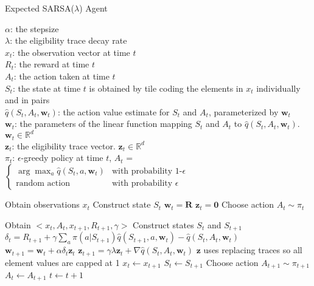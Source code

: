 \documentclass{article}
\begin{document}
\begin{algorithm}
\caption{Expected SARSA($\lambda$) Agent}\label{expectedsarsa}

$\alpha$: the stepsize \\
$\lambda$: the eligibility trace decay rate \\
$x_{t}$: the observation vector at time $t$ \\
$R_t$: the reward at time $t$ \\
$A_t$: the action taken at time $t$ \\
$S_t$: the state at time $t$ is obtained by tile coding the elements in $x_t$ individually and in pairs \\
$\hat{q}(S_t, A_t, \textbf{w}_t)$: the action value estimate for $S_t$ and $A_t$, parameterized by $\textbf{w}_t$\\
$\textbf{w}_t$: the parameters of the linear function mapping $S_t$ and $A_t$ to $\hat{q}(S_t, A_t, \textbf{w}_t)$. $\textbf{w}_t \in \mathbb{R}^d$ \\
$\textbf{z}_t$: the eligibility trace vector. $\textbf{z}_t \in \mathbb{R}^d$ \\
$\pi_t$: $\epsilon$-greedy policy at time $t$, $A_t$ = 
                        $\begin{cases} 
                            \arg\!\max_{a} \hat{q}(S_t, a, \textbf{w}_t) & \text{with probability 1-$\epsilon$} \\
                            \text{random action} & \text{with probability $\epsilon$}
                        \end{cases}$

\begin{algorithmic}[1]

\State Obtain observations $x_t$
\State Construct state $S_t$
\State $\textbf{w}_t = \textbf{R}$
\State $\textbf{z}_t = \textbf{0}$  
\State Choose action $A_t \sim \pi_t$ 

    \State Obtain $<x_t, A_t, x_{t+1}, R_{t+1}, \gamma>$
    \State Construct states $S_t$ and $S_{t+1}$
    \State $\delta_t = R_{t+1} + \gamma \displaystyle\sum_{a} \pi(a|S_{t+1}) \hat{q}(S_{t+1}, a, \textbf{w}_t)  - \hat{q}(S_t, A_t, \textbf{w}_t)$
    \State $\textbf{w}_{t+1} = \textbf{w}_{t} + \alpha \delta_t \textbf{z}_t$ 
    \State $\textbf{z}_{t+1} = \gamma \lambda \textbf{z}_t + \nabla \hat{q}(S_t, A_t, \textbf{w}_t)$ 
    \State $\textbf{z}$ uses replacing traces so all element values are capped at 1
    \State $x_t \xleftarrow{} x_{t+1}$
    \State $S_t \xleftarrow{} S_{t+1}$ 
    \State Choose action $A_{t+1} \sim \pi_{t+1}$
    \State $A_t \xleftarrow{} A_{t+1}$
    \State $t \xleftarrow{} t+1$
    
 
\EndWhile


\end{algorithmic}
\end{algorithm}
\end{document}
